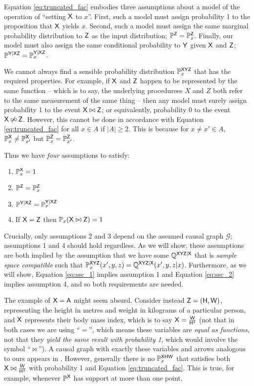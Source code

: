 Equation \ref{eq:truncated_fac} embodies three assumptions about a model of the operation of ``setting $\mathsf{X}$ to $x$''. First, such a model must assign probability 1 to the proposition that $\mathsf{X}$ yields $x$. Second, such a model must assign the same marginal probability distribution to $\mathsf{Z}$ as the input distribution; $\mathbb{P}^{\mathsf{Z}}=\mathbb{P}_{x}^{\mathsf{Z}}$. Finally, our model must also assign the same conditional probability to $\mathsf{Y}$ given $\mathsf{X}$ and $\mathsf{Z}$; $\mathbb{P}^{\mathsf{Y}|\mathsf{XZ}}=\mathbb{P}_x^{\mathsf{Y}|\mathsf{XZ}}$.

We cannot always find a sensible probability distribution $\mathbb{P}_x^{\mathsf{XYZ}}$ that has the required properties. For example, if $\mathsf{X}$ and $\mathsf{Z}$ happen to be represented by the same function -- which is to say, the underlying procedurees $X$ and $Z$ both refer to the same measurement of the same thing -- then any model must surely assign probability 1 to the event $\mathsf{X}\bowtie \mathsf{Z}$; or equivalently, probability 0 to the event $\mathsf{X}\not\bowtie \mathsf{Z}$. However, this cannot be done in accordance with Equation \ref{eq:truncated_fac} for all $x\in A$ if $|A|\geq 2$. This is because for $x\neq x'\in A$, $\mathbb{P}_x^{\mathsf{X}}\neq \mathbb{P}_{x'}^{\mathsf{X}}$ but $\mathbb{P}_x^{\mathsf{Z}}=\mathbb{P}_{x'}^{\mathsf{Z}}$.

Thus we have \emph{four} assumptions to satisfy:
\begin{enumerate}
	\item $\mathbb{P}_x^{\mathsf{X}}=1$
	\item $\mathbb{P}^{\mathsf{Z}}=\mathbb{P}_{x}^{\mathsf{Z}}$
	\item $\mathbb{P}^{\mathsf{Y}|\mathsf{XZ}}=\mathbb{P}_x^{\mathsf{Y}|\mathsf{XZ}}$
	\item If $\mathsf{X}=\mathsf{Z}$ then $\mathbb{P}_x(\mathsf{X}\bowtie \mathsf{Z})=1$
\end{enumerate}

Crucially, only assumptions 2 and 3 depend on the assumed causal graph $\mathcal{G}$; assumptions 1 and 4 should hold regardless. As we will show, these assumptions are both implied by the assumption that we have some $\mathbb{Q}^{\mathsf{XYZ}|\mathsf{X}}$ that is \emph{sample space compatible} such that $\mathbb{P}^{\mathsf{XYZ}}_x(x',y,z) = \mathbb{Q}^{\mathsf{XYZ}|\mathsf{X}}(x',y,z|x)$. Furthermore, as we will show, Equation \ref{eq:ssc_1} implies assumption 1 and Equation \ref{eq:ssc_2} implies assumption 4, and so both requirements are needed.

The example of $\mathsf{X}=\mathsf{A}$ might seem absurd. Consider instead $\mathsf{Z}=(\mathsf{H},\mathsf{W})$, representing the height in metres and weight in kilograms of a particular person, and $\mathsf{X}$ represents their body mass index, which is to say $\mathsf{X}=\frac{\mathsf{W}}{\mathsf{H}^2}$ (not that in both cases we are using ``$=$'', which means these variables are \emph{equal as functions}, not that they \emph{yield the same result with probability 1}, which would involve the symbol ``$\bowtie$''). A causal graph with exactly these variables and arrows analogous to ours appears in \citet{shahar_association_2009}. However, generally there is no $\mathbb{P}_x^{\mathsf{XHW}}$ that satisfies both $\mathsf{X}\bowtie \frac{\mathsf{W}}{\mathsf{H}^2}$ with probability 1 and Equation \ref{eq:truncated_fac}. This is true, for example, whenever $\mathbb{P}^{\mathsf{X}}$ has support at more than one point.

